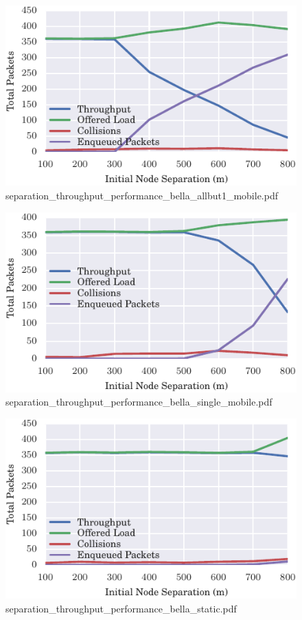 \documentclass{article}
\begin{document}
\begin{figure}[h!]
\centering
\includegraphics[width=\linewidth]{separation_throughput_performance_bella_allbut1_mobile.pdf}
\caption{separation\_throughput\_performance\_bella\_allbut1\_mobile.pdf}
\end{figure}




\begin{figure}[h!]
\centering
\includegraphics[width=\linewidth]{separation_throughput_performance_bella_single_mobile.pdf}
\caption{separation\_throughput\_performance\_bella\_single\_mobile.pdf}
\end{figure}




\begin{figure}[h!]
\centering
\includegraphics[width=\linewidth]{separation_throughput_performance_bella_static.pdf}
\caption{separation\_throughput\_performance\_bella\_static.pdf}
\end{figure}
\end{document}
